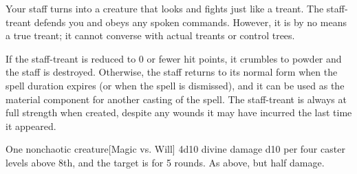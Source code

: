 \begin{spellheader}
    \spelldur{\durmed \dismissable}
\end{spellheader}
\begin{spelleffects}
    \spelleffect Your staff turns into a creature that looks and fights just like a treant. The staff-treant defends you and obeys any spoken commands. However, it is by no means a true treant; it cannot converse with actual treants or control trees.

    If the staff-treant is reduced to 0 or fewer hit points, it crumbles to powder and the staff is destroyed. Otherwise, the staff returns to its normal form when the spell duration expires (or when the spell is dismissed), and it can be used as the material component for another casting of the spell. The staff-treant is always at full strength when created, despite any wounds it may have incurred the last time it appeared.
\end{spelleffects}
\begin{spellfooter}
\end{spellfooter}

\begin{spellheader}
    \spellrng{\rngmed}
\end{spellheader}
\begin{spelleffects}
    \begin{spelltarget}{One nonchaotic creature}[Magic vs. Will]
        \spellsuccess 4d10 divine damage \add d10 per four caster levels above 8th, and the target is \bewildered for 5 rounds.
        \spellfailure As above, but half damage.
    \end{spelltarget}
\end{spelleffects}
\begin{spellfooter}
    
\end{spellfooter}

